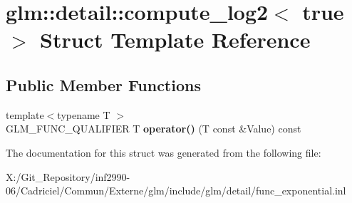 \hypertarget{structglm_1_1detail_1_1compute__log2_3_01true_01_4}{\section{glm\-:\-:detail\-:\-:compute\-\_\-log2$<$ true $>$ Struct Template Reference}
\label{structglm_1_1detail_1_1compute__log2_3_01true_01_4}
}
\subsection*{Public Member Functions}
\begin{DoxyCompactItemize}
\item 
\hypertarget{structglm_1_1detail_1_1compute__log2_3_01true_01_4_a4b8abe824c3c88324a640b5d88cbce99}{{\footnotesize template$<$typename T $>$ }\\G\-L\-M\-\_\-\-F\-U\-N\-C\-\_\-\-Q\-U\-A\-L\-I\-F\-I\-E\-R T {\bfseries operator()} (T const \&Value) const }\label{structglm_1_1detail_1_1compute__log2_3_01true_01_4_a4b8abe824c3c88324a640b5d88cbce99}

\end{DoxyCompactItemize}


The documentation for this struct was generated from the following file\-:\begin{DoxyCompactItemize}
\item 
X\-:/\-Git\-\_\-\-Repository/inf2990-\/06/\-Cadriciel/\-Commun/\-Externe/glm/include/glm/detail/func\-\_\-exponential.\-inl\end{DoxyCompactItemize}
